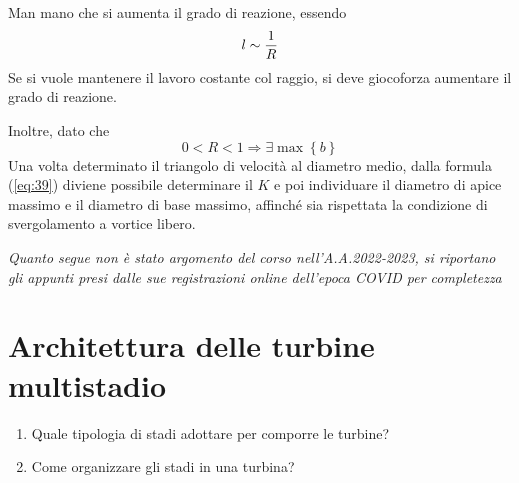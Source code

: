 \documentclass[a4paper, 15pt]{article}
\begin{document}
\begin{adjustwidth}{2in}{}
	 Man mano che si aumenta il grado di reazione, essendo
	 \[l\sim{1\over R}\]
	 Se si vuole mantenere il lavoro costante col raggio, si deve giocoforza aumentare il grado di reazione. 
	 
	Inoltre, dato che 
	\[0<R<1\Rightarrow\exists\max\left\{b\right\}\]
	Una volta determinato il triangolo di velocità al diametro medio, dalla formula (\ref{eq:39}) diviene possibile determinare il $K$ e poi individuare il diametro di apice massimo e il diametro di base massimo, affinché sia rispettata la condizione di svergolamento a vortice libero. 
	\end{adjustwidth}


\newpage 

\begin{center}
	\textit{Quanto segue non è stato argomento del corso nell'A.A.2022-2023, si riportano gli appunti presi dalle sue registrazioni online dell'epoca COVID per completezza}
\end{center}

\section{Architettura delle turbine multistadio}
\begin{enumerate}
	\item Quale tipologia di stadi adottare per comporre le turbine?
	\item Come organizzare gli stadi in una turbina?
\end{enumerate}
\end{document}
